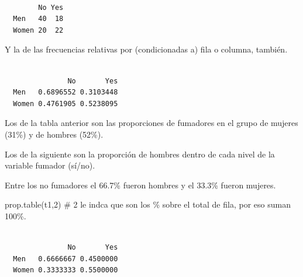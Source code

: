 \documentclass[
  letterpaper,
  DIV=11,
  numbers=noendperiod]{scrreprt}
\newenvironment{Shaded}{\begin{snugshade}}{\end{snugshade}}
\newcommand{\CommentTok}[1]{\textcolor[rgb]{0.37,0.37,0.37}{#1}}
\newcommand{\DecValTok}[1]{\textcolor[rgb]{0.68,0.00,0.00}{#1}}
\newcommand{\FunctionTok}[1]{\textcolor[rgb]{0.28,0.35,0.67}{#1}}
\newcommand{\NormalTok}[1]{\textcolor[rgb]{0.00,0.23,0.31}{#1}}
\newcommand{\OtherTok}[1]{\textcolor[rgb]{0.00,0.23,0.31}{#1}}
\newcommand{\SpecialCharTok}[1]{\textcolor[rgb]{0.37,0.37,0.37}{#1}}
\begin{document}
\begin{Shaded}
\end{Shaded}

\begin{verbatim}
       
        No Yes
  Men   40  18
  Women 20  22
\end{verbatim}

Y la de las frecuencias relativas por (condicionadas a) fila o columna,
también.

\begin{Shaded}
\end{Shaded}

\begin{verbatim}
       
               No       Yes
  Men   0.6896552 0.3103448
  Women 0.4761905 0.5238095
\end{verbatim}

Los de la tabla anterior son las proporciones de fumadores en el grupo
de mujeres (31\%) y de hombres (52\%).

Los de la siguiente son la proporción de hombres dentro de cada nivel de
la variable fumador (sí/no).

Entre los no fumadores el 66.7\% fueron hombres y el 33.3\% fueron
mujeres.

\begin{Shaded}
\begin{Highlighting}[]
\FunctionTok{prop.table}\NormalTok{(t1,}\DecValTok{2}\NormalTok{) }\CommentTok{\# 2 le indca que son los \% sobre el total de fila, por eso suman 100\%.}
\end{Highlighting}
\end{Shaded}

\begin{verbatim}
       
               No       Yes
  Men   0.6666667 0.4500000
  Women 0.3333333 0.5500000
\end{verbatim}
\end{document}
